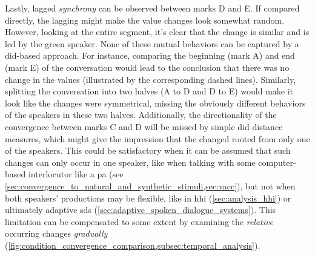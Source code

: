 Lastly, lagged \emph{synchrony} can be observed between marks D and E.
If compared directly, the lagging might make the value changes look somewhat random.
However, looking at the entire segment, it's clear that the change is similar and is led by the green speaker.
None of these mutual behaviors can be captured by a \ac{did}-based approach.
For instance, comparing the beginning (mark A) and end (mark E) of the conversation would lead to the conclusion that there was no change in the values (illustrated by the corresponding dashed lines).
Similarly, splitting the conversation into two halves (A to D and D to E) would make it look like the changes were symmetrical, missing the obviously different behaviors of the speakers in these two halves.
Additionally, the directionality of the convergence between marks C and D will be missed by simple \ac{did} distance measures, which might give the impression that the changed rooted from only one of the speakers.
This could be satisfactory when it can be assumed that such changes can only occur in one speaker, like when talking with some computer-based interlocutor like a \ac{pa} (see \cref{sec:convergence_to_natural_and_synthetic_stimuli,sec:vacc}), but not when both speakers' productions may be flexible, like in \ac{hhi} (\cref{sec:analysis_hhi}) or ultimately adaptive \acl{sds} (\cref{sec:adaptive_spoken_dialogue_systems}).
This limitation can be compensated to some extent by examining the \emph{relative} occurring changes \emph{gradually} (\cref{fig:condition_convergence_comparison,subsec:temporal_analysis}).


